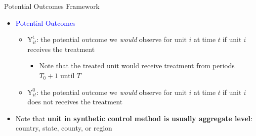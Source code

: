\documentclass[hyperref={pdfpagelabels=false}]{beamer}
\begin{document}
\begin{frame}{Potential Outcomes Framework}{}
\begin{itemize}
\item \textcolor{blue}{Potential Outcomes}
\vspace{0.2cm}
\begin{itemize}
\item $\mathrm{Y}^{1}_{it}$: the potential outcome we \textit{would} observe for unit $i$ at time $t$ if unit $i$ receives the treatment 
\vspace{0.2cm}
\begin{itemize}
\item Note that the treated unit would receive treatment from periods $T_0+1$ until $T$
\end{itemize}
\vspace{0.2cm}
\item $\mathrm{Y}^{0}_{it}$: the potential outcome we \textit{would} observe for unit $i$ at time $t$ if unit $i$ does not receives the treatment
\end{itemize}
\vspace{0.2cm}
\item Note that \textbf{unit in synthetic control method is usually aggregate level}: country, state, county, or region 



\end{itemize}
\end{frame}
\end{document}
